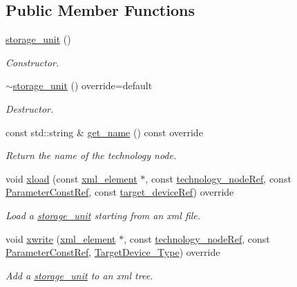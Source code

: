 \subsection*{Public Member Functions}
\begin{DoxyCompactItemize}
\item 
\hyperlink{structstorage__unit_aa0a788929d57fbe8e746523587c7b362}{storage\+\_\+unit} ()
\begin{DoxyCompactList}\small\item\em Constructor. \end{DoxyCompactList}\item 
\hyperlink{structstorage__unit_adb4df67a33ed30ae808fdcf74176d2e1}{$\sim$storage\+\_\+unit} () override=default
\begin{DoxyCompactList}\small\item\em Destructor. \end{DoxyCompactList}\item 
const std\+::string \& \hyperlink{structstorage__unit_a264a6ad9a5d692f1f779e4c803df33d7}{get\+\_\+name} () const override
\begin{DoxyCompactList}\small\item\em Return the name of the technology node. \end{DoxyCompactList}\item 
void \hyperlink{structstorage__unit_aaeebe9291ea4f0a68ad7d9f784804fa0}{xload} (const \hyperlink{classxml__element}{xml\+\_\+element} $\ast$, const \hyperlink{technology__node_8hpp_a33dd193b7bd6b987bf0d8a770a819fa7}{technology\+\_\+node\+Ref}, const \hyperlink{Parameter_8hpp_a37841774a6fcb479b597fdf8955eb4ea}{Parameter\+Const\+Ref}, const \hyperlink{target__device_8hpp_acedb2b7a617e27e6354a8049fee44eda}{target\+\_\+device\+Ref}) override
\begin{DoxyCompactList}\small\item\em Load a \hyperlink{structstorage__unit}{storage\+\_\+unit} starting from an xml file. \end{DoxyCompactList}\item 
void \hyperlink{structstorage__unit_ae685e07bc1e5d1c8f7a18f2ddf646dc9}{xwrite} (\hyperlink{classxml__element}{xml\+\_\+element} $\ast$, const \hyperlink{technology__node_8hpp_a33dd193b7bd6b987bf0d8a770a819fa7}{technology\+\_\+node\+Ref}, const \hyperlink{Parameter_8hpp_a37841774a6fcb479b597fdf8955eb4ea}{Parameter\+Const\+Ref}, \hyperlink{target__device_8hpp_a476becc690220f0805ce73006449c732}{Target\+Device\+\_\+\+Type}) override
\begin{DoxyCompactList}\small\item\em Add a \hyperlink{structstorage__unit}{storage\+\_\+unit} to an xml tree. \end{DoxyCompactList}\item 

\end{DoxyCompactItemize}
